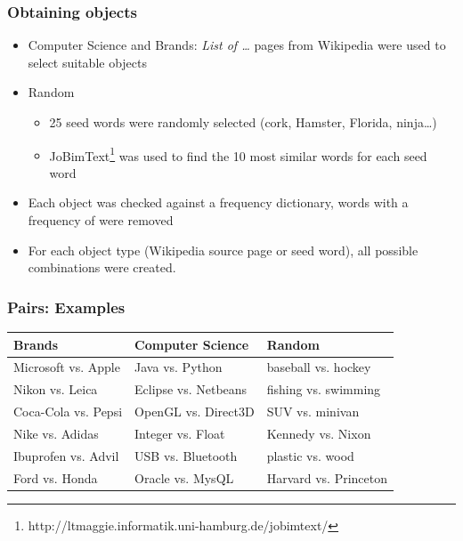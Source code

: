\documentclass[11pt,aspectratio=169]{beamer}
\begin{document}
    \begin{frame}
        \frametitle{Obtaining objects}
        \begin{itemize}
            \item Computer Science and Brands: \emph{List of \ldots} pages from Wikipedia were used to select suitable objects
            \item Random
            \begin{itemize}
                \item 25 seed words were randomly selected (cork, Hamster, Florida, ninja\ldots)
                \item JoBimText\footnote{http://ltmaggie.informatik.uni-hamburg.de/jobimtext/} was used to find the 10 most similar words for each seed word
            \end{itemize}
            \item Each object was checked against a frequency dictionary, words with a frequency of were removed
            \item For each object type (Wikipedia source page or seed word), all possible combinations were created.
        \end{itemize}

    \end{frame}

    \begin{frame}
        \frametitle{Pairs: Examples}

        \begin{tabularx}{\textwidth}{XXX}
            \toprule
            Brands & Computer Science & Random \\
            \midrule
            Microsoft vs. Apple & Java vs. Python & baseball vs. hockey \\
            Nikon vs. Leica & Eclipse vs. Netbeans & fishing vs. swimming\\
            Coca-Cola vs. Pepsi & OpenGL vs. Direct3D & SUV vs. minivan\\
            Nike vs. Adidas & Integer vs. Float & Kennedy vs. Nixon\\
            Ibuprofen vs. Advil & USB vs. Bluetooth & plastic vs. wood\\
            Ford vs. Honda & Oracle vs. MysQL & Harvard vs. Princeton\\

            \bottomrule

        \end{tabularx}

    \end{frame}
\end{document}

